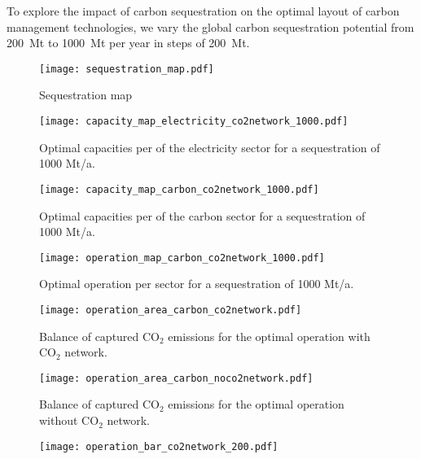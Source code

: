 To explore the impact of carbon sequestration on the optimal layout of carbon management technologies, we vary the global carbon sequestration potential from 200~Mt to 1000~Mt per year in steps of 200~Mt.

\begin{figure}
    \centering
    \texttt{[image: sequestration\_map.pdf]}
    \caption{Sequestration map}
    \label{fig:sequestration_map}
\end{figure}


\begin{figure}[h]
    \centering
    \texttt{[image: capacity\_map\_electricity\_co2network\_1000.pdf]}
    \caption{Optimal capacities per of the electricity sector for a sequestration of 1000 Mt/a.}
    \label{fig:capacity_map_noco2network_1000}
\end{figure}


\begin{figure}[h]
    \centering
    \texttt{[image: capacity\_map\_carbon\_co2network\_1000.pdf]}
    \caption{Optimal capacities per of the carbon sector for a sequestration of 1000 Mt/a.}
    \label{fig:capacity_map_noco2network_1000}
\end{figure}



\begin{figure*}
    \centering
    \texttt{[image: operation\_map\_carbon\_co2network\_1000.pdf]}
    \caption{Optimal operation per sector for a sequestration of 1000 Mt/a.}
    \label{fig:operation_map_noco2network_1000}
\end{figure*}


\begin{figure}
    \centering
    \texttt{[image: operation\_area\_carbon\_co2network.pdf]}
    \caption{Balance of captured CO$_2$ emissions for the optimal operation with CO$_2$ network.}
    \label{fig:operation_area_carbon_co2network}
\end{figure}

\begin{figure}
    \centering
    \texttt{[image: operation\_area\_carbon\_noco2network.pdf]}
    \caption{Balance of captured CO$_2$ emissions for the optimal operation without CO$_2$ network.}
    \label{fig:operation_area_carbon_noco2network}
\end{figure}


\begin{figure}
    \centering
    \texttt{[image: operation\_bar\_co2network\_200.pdf]}
\end{figure}
